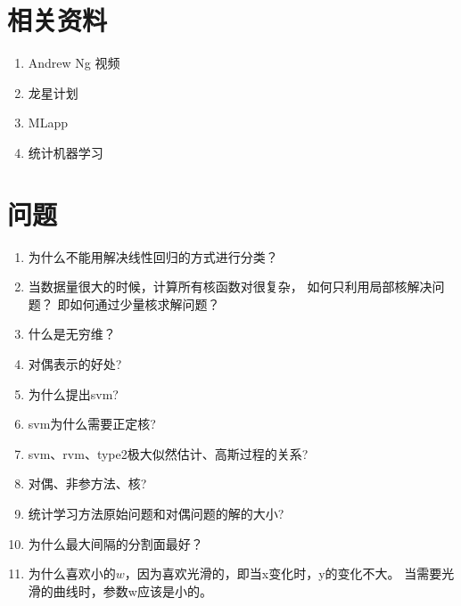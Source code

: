 \section{相关资料}
\begin{enumerate}
\item Andrew Ng 视频
\item 龙星计划
\item MLapp
\item 统计机器学习
\end{enumerate}

\section{问题}
\begin{enumerate}
\item 为什么不能用解决线性回归的方式进行分类？
\item 当数据量很大的时候，计算所有核函数对很复杂，
如何只利用局部核解决问题？ 即如何通过少量核求解问题？
\item 什么是无穷维？
\item 对偶表示的好处?
\item 为什么提出svm?
\item svm为什么需要正定核?
\item svm、rvm、type2极大似然估计、高斯过程的关系?
\item 对偶、非参方法、核?
\item 统计学习方法原始问题和对偶问题的解的大小?
\item 为什么最大间隔的分割面最好？
\item 为什么喜欢小的$w$，因为喜欢光滑的，即当x变化时，y的变化不大。
当需要光滑的曲线时，参数w应该是小的。
\end{enumerate}


